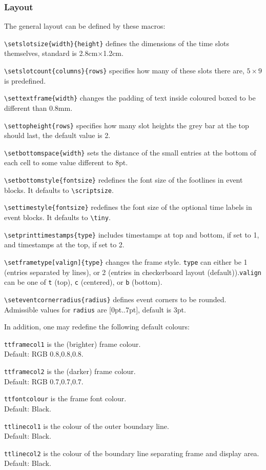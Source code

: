 \documentclass[a4paper,10pt]{article}
\begin{document}
\subsubsection{Layout}
The general layout can be defined by these macros:
\begin{description}
\item \lstinline!\setslotsize{width}{height}! defines the dimensions of the time slots themselves, standard is 2.8cm$\times$1.2cm.
\item \lstinline!\setslotcount{columns}{rows}! specifies how many of these slots there are, $5\times9$ is predefined.
\item \lstinline!\settextframe{width}! changes the padding of text inside coloured boxed to be different than 0.8mm.
\item \lstinline!\settopheight{rows}! specifies how many slot heights the grey bar at the top should last, the default value is 2.
\item \lstinline!\setbottomspace{width}! sets the distance of the small entries at the bottom of each cell to some value different to 8pt.
\item \lstinline!\setbottomstyle{fontsize}! redefines the font size of the footlines in event blocks. It defaults to \lstinline!\scriptsize!.
\item \lstinline!\settimestyle{fontsize}! redefines the font size of the optional time labels in event blocks. It defaults to \lstinline!\tiny!.
\item \lstinline!\setprinttimestamps{type}! includes timestamps at top and bottom, if set to 1, and timestamps at the top, if set to 2.
\item \lstinline!\setframetype[valign]{type}! changes the frame style. \texttt{type} can either be 1 (entries separated by lines), or 2 (entries in checkerboard layout (default)).\texttt{valign} can be one of \texttt{t} (top), \texttt{c} (centered), or \texttt{b} (bottom).
\item \lstinline!\seteventcornerradius{radius}! defines event corners to be rounded. Admissible values for \texttt{radius} are [0pt..7pt], default is 3pt.
\end{description}
In addition, one may redefine the following default colours:
\begin{description}
\item \lstinline!ttframecol1! is the (brighter) frame colour.\\ Default: RGB 0.8,0.8,0.8.
\item \lstinline!ttframecol2! is the (darker) frame colour.\\ Default: RGB 0.7,0.7,0.7.
\item \lstinline!ttfontcolour! is the frame font colour.\\ Default: Black.
\item \lstinline!ttlinecol1! is the colour of the outer boundary line.\\ Default: Black.
\item \lstinline!ttlinecol2! is the colour of the boundary line separating frame and display area.\\ Default: Black.
\end{description}
\end{document}
